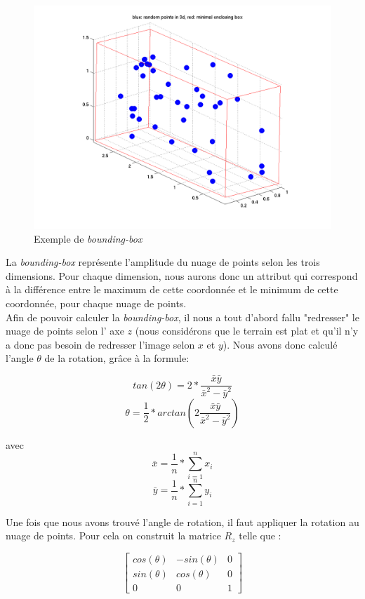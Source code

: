 		\begin{figure}[H]
			\centering
			\includegraphics[scale=0.6]{images/bounding-box.png}
			\caption{Exemple de \emph{bounding-box}}
			\label{fig:image}
		\end{figure}

		La \emph{bounding-box} représente l'amplitude du nuage de points selon les trois dimensions. Pour chaque dimension, nous aurons donc un attribut qui correspond à la différence entre le maximum de cette coordonnée et le minimum de cette coordonnée, pour chaque nuage de points.\\

		Afin de pouvoir calculer la \emph{bounding-box}, il nous a tout d'abord fallu  "redresser" le nuage de points selon l' axe $z$ (nous considérons que le terrain est plat et qu'il n'y a donc pas besoin de redresser l'image selon $x$ et $y$).
		Nous avons donc calculé l'angle $\theta$ de la rotation, grâce à la formule:

		\[ tan(2 \theta) = 2 * \frac{\bar{x}\bar{y}}{\bar{x}^2 - \bar{y}^2} \]
		\[ \theta = \frac{1}{2} * arctan(2 \frac{\bar{x}\bar{y}}{\bar{x}^2 - \bar{y}^2}) \]

		avec \[ \bar{x} = \frac{1}{n} * \sum_{i =1}^n{x_i} \]
		\[ \bar{y} = \frac{1}{n} * \sum_{i =1}^n{y_i} \]

		Une fois que nous avons trouvé l'angle de rotation, il faut appliquer la rotation au nuage de points. Pour cela on construit la matrice $R_z$ telle que :

		\[\begin{bmatrix}
		   cos(\theta) & -sin(\theta) & 0 \\
		sin(\theta) & cos(\theta) & 0 \\
		0 & 0 & 1
		\end{bmatrix}\]

